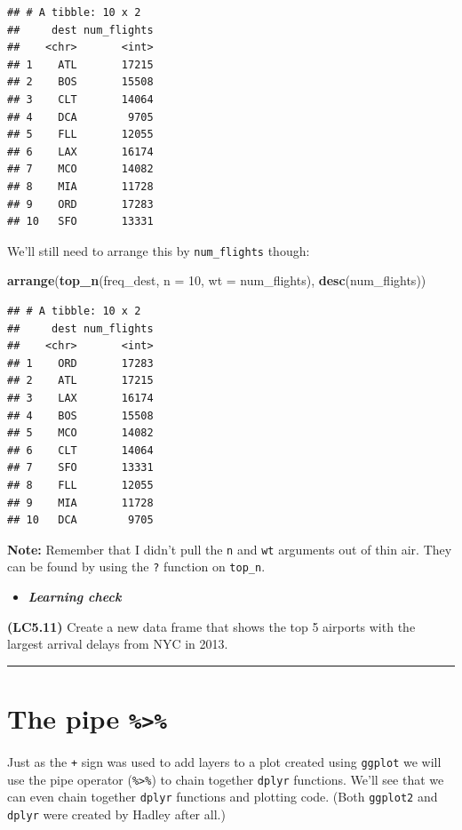 \documentclass[]{tufte-book}
\newenvironment{Shaded}{\begin{snugshade}}{\end{snugshade}}
\newcommand{\KeywordTok}[1]{\textcolor[rgb]{0.13,0.29,0.53}{\textbf{{#1}}}}
\newcommand{\DataTypeTok}[1]{\textcolor[rgb]{0.13,0.29,0.53}{{#1}}}
\newcommand{\DecValTok}[1]{\textcolor[rgb]{0.00,0.00,0.81}{{#1}}}
\newcommand{\NormalTok}[1]{{#1}}
\newenvironment{rmdblock}[1]
  {\begin{shaded*}
  \begin{itemize}
  \renewcommand{\labelitemi}{
    \raisebox{-.7\height}[0pt][0pt]{
    }
  }
  \item
  }
  {
  \end{itemize}
  \end{shaded*}
  }
\newenvironment{learncheck}
  {\begin{rmdblock}{warning}}
  {\end{rmdblock}}
\begin{document}
\begin{verbatim}
## # A tibble: 10 x 2
##     dest num_flights
##    <chr>       <int>
## 1    ATL       17215
## 2    BOS       15508
## 3    CLT       14064
## 4    DCA        9705
## 5    FLL       12055
## 6    LAX       16174
## 7    MCO       14082
## 8    MIA       11728
## 9    ORD       17283
## 10   SFO       13331
\end{verbatim}

We'll still need to arrange this by \texttt{num\_flights} though:

\begin{Shaded}
\begin{Highlighting}[]
\KeywordTok{arrange}\NormalTok{(}\KeywordTok{top_n}\NormalTok{(freq_dest, }\DataTypeTok{n =} \DecValTok{10}\NormalTok{, }\DataTypeTok{wt =} \NormalTok{num_flights), }\KeywordTok{desc}\NormalTok{(num_flights))}
\end{Highlighting}
\end{Shaded}

\begin{verbatim}
## # A tibble: 10 x 2
##     dest num_flights
##    <chr>       <int>
## 1    ORD       17283
## 2    ATL       17215
## 3    LAX       16174
## 4    BOS       15508
## 5    MCO       14082
## 6    CLT       14064
## 7    SFO       13331
## 8    FLL       12055
## 9    MIA       11728
## 10   DCA        9705
\end{verbatim}

\textbf{Note:} Remember that I didn't pull the \texttt{n} and
\texttt{wt} arguments out of thin air. They can be found by using the
\texttt{?} function on \texttt{top\_n}.

\begin{learncheck}
\textbf{\emph{Learning check}}
\end{learncheck}

\textbf{(LC5.11)} Create a new data frame that shows the top 5 airports
with the largest arrival delays from NYC in 2013.

\begin{center}\rule{\linewidth}{\linethickness}\end{center}

\section{\texorpdfstring{The pipe
\texttt{\%\textgreater{}\%}}{The pipe \%\textgreater{}\%}}\label{the-pipe}

Just as the \texttt{+} sign was used to add layers to a plot created
using \texttt{ggplot} we will use the pipe operator
(\texttt{\%\textgreater{}\%}) to chain together \texttt{dplyr}
functions. We'll see that we can even chain together \texttt{dplyr}
functions and plotting code. (Both \texttt{ggplot2} and \texttt{dplyr}
were created by Hadley after all.)
\end{document}
